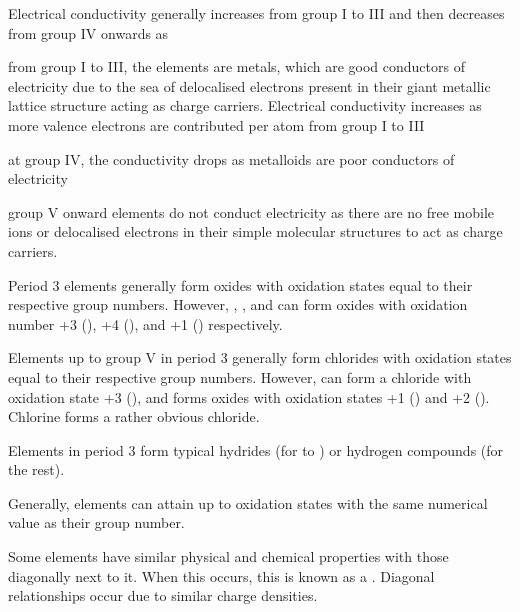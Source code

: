 \documentclass[Chemistry.tex]{subfiles}
\begin{document}
Electrical conductivity generally increases from group I to III and then decreases from group IV onwards as \begin{slinenum}
\item from group I to III, the elements are metals, which are good conductors of electricity due to the sea of delocalised electrons present in their giant metallic lattice structure acting as charge carriers. Electrical conductivity increases as more valence electrons are contributed per atom from group I to III
\item at group IV, the conductivity drops as metalloids are poor conductors of electricity
\item group V onward elements do not conduct electricity as there are no free mobile ions or delocalised electrons in their simple molecular structures to act as charge carriers.
\end{slinenum}

Period 3 elements generally form oxides with oxidation states equal to their respective group numbers. However, , , and  can form oxides with oxidation number +3 (), +4 (), and +1 () respectively.

Elements up to group V in period 3 generally form chlorides with oxidation states equal to their respective group numbers. However,  can form a chloride with oxidation state +3 (), and  forms oxides with oxidation states +1 () and +2 (). Chlorine forms a rather obvious chloride.

Elements in period 3 form typical hydrides (for  to ) or hydrogen compounds (for the rest).

Generally, elements can attain up to oxidation states with the same numerical value as their group number.

Some elements have similar physical and chemical properties with those diagonally next to it. When this occurs, this is known as a . Diagonal relationships occur due to similar charge densities.
\end{document}
